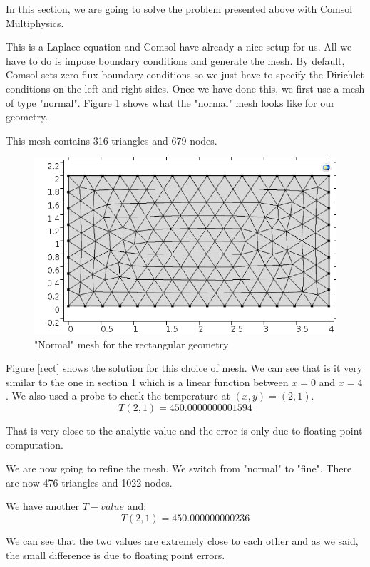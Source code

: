 In this section, we are going to solve the problem presented above with Comsol Multiphysics.

This is a Laplace equation and Comsol have already a nice setup for us. All we have to do is impose boundary conditions and generate the mesh. By default, Comsol sets zero flux boundary conditions so we just have to specify the Dirichlet conditions on the left and right sides. Once we have done this, we first use a mesh of type "normal". Figure \ref{mesh} shows what the "normal" mesh looks like for our geometry.

This mesh contains 316 triangles and 679 nodes.

\begin{figure}
\begin{center}
\includegraphics[scale=0.6]{laplaceMesh.png}
\caption{"Normal" mesh for the rectangular geometry}
\label{mesh}
\end{center}
\end{figure}

Figure \ref{rect} shows the solution for this choice of mesh. We can see that is it very similar to the one in section 1 which is a linear function between $x=0$ and $x=4$. We also used a probe to check the temperature at $(x,y)=(2,1)$.
$$T(2,1) = 450.0000000001594$$

That is very close to the analytic value and the error is only due to floating point computation.

We are now going to refine the mesh. We switch from "normal" to "fine". There are now 476 triangles and 1022 nodes.

We have another $T-value$ and:
$$T(2,1) = 450.000000000236$$

We can see that the two values are extremely close to each other and as we said, the small difference is due to floating point errors.

